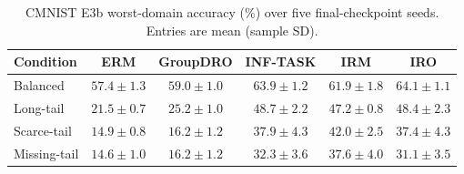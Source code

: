 \begin{table}[t]
\centering
\small
\caption{CMNIST E3b worst-domain accuracy (\%) over five final-checkpoint seeds. Entries are mean (sample SD).}
\label{tab:cmnist-e3b-worst-domain-accuracy}
\begin{tabular}{lccccc}
\toprule
Condition & ERM & GroupDRO & INF-TASK & IRM & IRO \\
\midrule
Balanced
& $57.4 \pm 1.3$ & $59.0 \pm 1.0$ & $63.9 \pm 1.2$ & $61.9 \pm 1.8$ & $64.1 \pm 1.1$ \\
Long-tail
& $21.5 \pm 0.7$ & $25.2 \pm 1.0$ & $48.7 \pm 2.2$ & $47.2 \pm 0.8$ & $48.4 \pm 2.3$ \\
Scarce-tail
& $14.9 \pm 0.8$ & $16.2 \pm 1.2$ & $37.9 \pm 4.3$ & $42.0 \pm 2.5$ & $37.4 \pm 4.3$ \\
Missing-tail
& $14.6 \pm 1.0$ & $16.2 \pm 1.2$ & $32.3 \pm 3.6$ & $37.6 \pm 4.0$ & $31.1 \pm 3.5$ \\
\bottomrule
\end{tabular}
\end{table}
